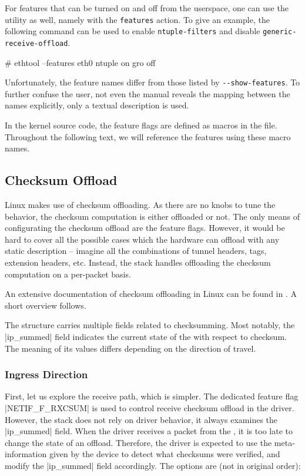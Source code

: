 For features that can be turned on and off from the userspace, one can use the
 utility as well, namely with the \texttt{features} action. To give
an example, the following command can be used to enable \texttt{ntuple-filters}
and disable \texttt{generic-receive-offload}.

\begin{shell}
# ethtool --features eth0 ntuple on gro off
\end{shell}

Unfortunately, the feature names differ from those listed by
\Verb|--show-features|. To further confuse the user, not even the manual
reveals the mapping between the names explicitly, only a textual description is used.

In the kernel source code, the feature flags are defined as macros in the
 file. Throughout the following text, we
will reference the features using these macro names.

\subsection{Checksum Offload}
\label{sec:linux-csum}

Linux makes use of checksum offloading. As there are no knobs to tune the
behavior, the checksum computation is either offloaded or not. The only means
of configurating the checksum offload are the feature flags. However, it would
be hard to cover all the possible cases which the hardware can offload with any
static description -- imagine all the combinations of tunnel headers, 
tags,  extension headers, etc. Instead, the stack handles offloading
the checksum computation on a per-packet basis.

An extensive documentation of checksum offloading in Linux can be found in
. A short overview follows.

The \skb{} structure carries multiple fields related to checksumming. Most
notably, the \field|ip_summed| field indicates the current state of the \skb{}
with respect to checksum. The meaning of its values differs depending on
the direction of travel.

\subsubsection{Ingress Direction}

First, let us explore the receive path, which is simpler. The dedicated feature
flag \macro|NETIF_F_RXCSUM| is used to control receive checksum offload in the
driver. However, the stack does not rely on driver behavior, it always examines
the \field|ip_summed| field. When the driver receives a packet from
the , it is too late to change the state of an offload. Therefore, the
driver is expected to use the meta-information given by the device to detect what
checksums were verified, and modify the \field|ip_summed| field accordingly.
The options are (not in original order):

